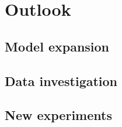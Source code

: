 \chapter{Outlook}

\ifpdf
\graphicspath{{Chapter5/Figs/Raster/}{Chapter5/Figs/PDF/}{Chapter5/Figs/}}
\else
\graphicspath{{Chapter5/Figs/Vector/}{Chapter5/Figs/}}
\fi

\section{Model expansion}

\section{Data investigation}

\section{New experiments}

